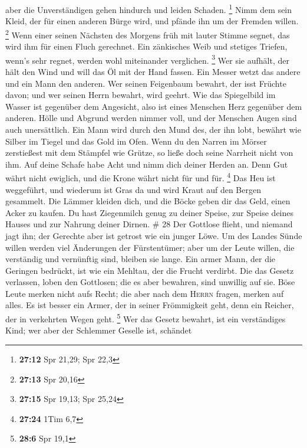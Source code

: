aber die Unverständigen gehen hindurch und leiden Schaden. \footnote{\textbf{27:12}
  Spr 21,29; Spr 22,3}  Nimm dem sein Kleid, der für
einen anderen Bürge wird, und pfände ihn um der Fremden willen.
\footnote{\textbf{27:13} Spr 20,16}  Wenn einer seinen
Nächsten des Morgens früh mit lauter Stimme segnet, das wird ihm für
einen Fluch gerechnet.  Ein zänkisches Weib und stetiges
Triefen, wenn's sehr regnet, werden wohl miteinander verglichen.
\footnote{\textbf{27:15} Spr 19,13; Spr 25,24}  Wer sie
aufhält, der hält den Wind und will das Öl mit der Hand fassen.
 Ein Messer wetzt das andere und ein Mann den anderen.
 Wer seinen Feigenbaum bewahrt, der isst Früchte davon;
und wer seinen Herrn bewahrt, wird geehrt.  Wie das
Spiegelbild im Wasser ist gegenüber dem Angesicht, also ist eines
Menschen Herz gegenüber dem anderen.  Hölle und Abgrund
werden nimmer voll, und der Menschen Augen sind auch unersättlich.
 Ein Mann wird durch den Mund des, der ihn lobt, bewährt
wie Silber im Tiegel und das Gold im Ofen.  Wenn du den
Narren im Mörser zerstießest mit dem Stämpfel wie Grütze, so ließe doch
seine Narrheit nicht von ihm.  Auf deine Schafe habe Acht
und nimm dich deiner Herden an.  Denn Gut währt nicht
ewiglich, und die Krone währt nicht für und für. \footnote{\textbf{27:24}
  1Tim 6,7}  Das Heu ist weggeführt, und wiederum ist
Gras da und wird Kraut auf den Bergen gesammelt.  Die
Lämmer kleiden dich, und die Böcke geben dir das Geld, einen Acker zu
kaufen.  Du hast Ziegenmilch genug zu deiner Speise, zur
Speise deines Hauses und zur Nahrung deiner Dirnen. \# 28 
Der Gottlose flieht, und niemand jagt ihn; der Gerechte aber ist getrost
wie ein junger Löwe.  Um des Landes Sünde willen werden
viel Änderungen der Fürstentümer; aber um der Leute willen, die
verständig und vernünftig sind, bleiben sie lange.  Ein
armer Mann, der die Geringen bedrückt, ist wie ein Mehltau, der die
Frucht verdirbt.  Die das Gesetz verlassen, loben den
Gottlosen; die es aber bewahren, sind unwillig auf sie. 
Böse Leute merken nicht aufs Recht; die aber nach dem \textsc{Herrn}
fragen, merken auf alles.  Es ist besser ein Armer, der in
seiner Frömmigkeit geht, denn ein Reicher, der in verkehrten Wegen geht.
\footnote{\textbf{28:6} Spr 19,1}  Wer das Gesetz bewahrt,
ist ein verständiges Kind; wer aber der Schlemmer Geselle ist, schändet
